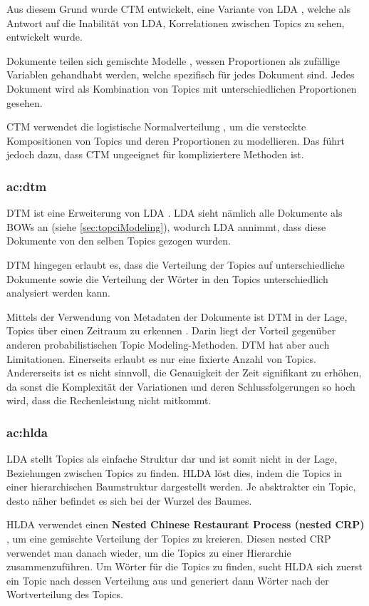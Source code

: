 Aus diesem Grund wurde CTM entwickelt, eine Variante von LDA \cite[175]{topicmodelsurvey_padmaja}, welche als Antwort auf die Inabilität von LDA, Korrelationen zwischen Topics zu sehen, entwickelt wurde.

Dokumente teilen sich gemischte Modelle \cite[175]{topicmodelsurvey_padmaja}, wessen Proportionen als zufällige Variablen gehandhabt werden, welche spezifisch für jedes Dokument sind. Jedes Dokument wird als Kombination von Topics mit unterschiedlichen Proportionen gesehen.

CTM verwendet die logistische Normalverteilung \cite[175]{topicmodelsurvey_padmaja}, um die versteckte Kompositionen von Topics und deren Proportionen zu modellieren. Das führt jedoch dazu, dass CTM ungeeignet für kompliziertere Methoden ist.

\subsubsection{\acrfull{ac:dtm}}

DTM ist eine Erweiterung von LDA \cite[175]{topicmodelsurvey_padmaja}. LDA sieht nämlich alle Dokumente als BOWs an (siehe \ref{sec:topciModeling}), wodurch LDA annimmt, dass diese Dokumente von den selben Topics gezogen wurden.

DTM hingegen erlaubt es, dass die Verteilung der Topics auf unterschiedliche Dokumente \cite[175]{topicmodelsurvey_padmaja} sowie die Verteilung der Wörter in den Topics unterschiedlich analysiert werden kann.

Mittels der Verwendung von Metadaten der Dokumente ist DTM in der Lage, Topics über einen Zeitraum zu erkennen \cite[175]{topicmodelsurvey_padmaja}. Darin liegt der Vorteil gegenüber anderen probabilistischen Topic Modeling-Methoden. DTM hat aber auch Limitationen. Einerseits erlaubt es nur eine fixierte Anzahl von Topics. Andererseits ist es nicht sinnvoll, die Genauigkeit der Zeit signifikant zu erhöhen, da sonst die Komplexität der Variationen und deren Schlussfolgerungen so hoch wird, dass die Rechenleistung nicht mitkommt.

\subsubsection{\acrfull{ac:hlda}}

LDA stellt Topics als einfache Struktur dar \cite[175]{topicmodelsurvey_padmaja} und ist somit nicht in der Lage, Beziehungen zwischen Topics zu finden. HLDA löst dies, indem die Topics in einer hierarchischen Baumstruktur dargestellt werden. Je absktrakter ein Topic, desto näher befindet es sich bei der Wurzel des Baumes.

HLDA verwendet einen \textbf{Nested Chinese Restaurant Process (nested CRP)} \cite[175]{topicmodelsurvey_padmaja}, um eine gemischte Verteilung der Topics zu kreieren. Diesen nested CRP verwendet man danach wieder, um die Topics zu einer Hierarchie zusammenzuführen. Um Wörter für die Topics zu finden, sucht HLDA sich zuerst ein Topic nach dessen Verteilung aus und generiert dann Wörter nach der Wortverteilung des Topics.
